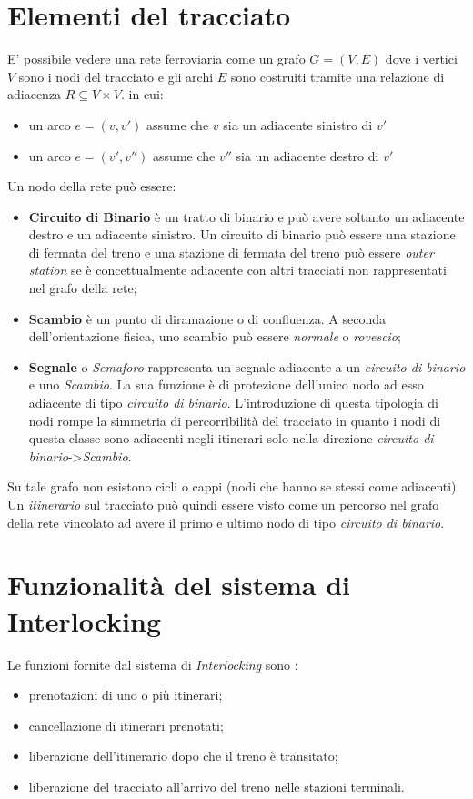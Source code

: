 \documentclass[10pt,a4paper,oneside]{report}
\begin{document}
\section{Elementi del tracciato}
E' possibile vedere una rete ferroviaria come un grafo $G =(V,E) $ dove i vertici $V$ sono i nodi del tracciato e gli archi $E$ sono costruiti tramite una relazione di adiacenza $R \subseteq V \times V$. in cui:
\begin{itemize}
\item un arco $e=(v,v')$ assume che $v$ sia un adiacente sinistro di $v'$
\item un arco $e=(v',v'')$ assume che $v''$ sia un adiacente destro di $v'$
\end{itemize}
Un nodo della rete può essere:
\begin{itemize}
\item \textbf{Circuito di Binario} è un tratto di binario e può avere soltanto un adiacente destro e un adiacente sinistro. Un circuito di binario può essere una stazione di fermata del treno e una stazione di fermata del treno può essere \emph{outer station} se è concettualmente adiacente con altri tracciati non rappresentati nel grafo della rete;
\item \textbf{Scambio} è un punto di diramazione o di confluenza. A seconda dell'orientazione fisica, uno scambio può essere \textit{normale} o \textit{rovescio};
\item \textbf{Segnale} o \emph{Semaforo} rappresenta un segnale adiacente a un \emph{circuito di binario} e uno \emph{Scambio}. La sua funzione è di protezione dell'unico nodo ad esso adiacente di tipo \emph{circuito di binario}.  L'introduzione di questa tipologia di nodi rompe la simmetria di percorribilità del tracciato in quanto i nodi di questa classe sono adiacenti negli itinerari solo nella direzione \emph{circuito di binario}-\textgreater\emph{Scambio}.
\end{itemize}
Su tale grafo non esistono cicli o cappi (nodi che hanno se stessi come adiacenti).
Un \emph{itinerario} sul tracciato può quindi essere visto come un percorso nel grafo della rete vincolato ad avere il primo e ultimo nodo di tipo \emph{circuito di binario}.
\section{Funzionalità del sistema di Interlocking}
Le funzioni fornite dal sistema di \emph{Interlocking} sono :
\begin{itemize}
\item prenotazioni di uno o più itinerari;
\item cancellazione di itinerari prenotati;
\item liberazione dell'itinerario dopo che il treno è transitato;
\item liberazione del tracciato all'arrivo del treno nelle stazioni terminali.
\end{itemize}
\end{document}
